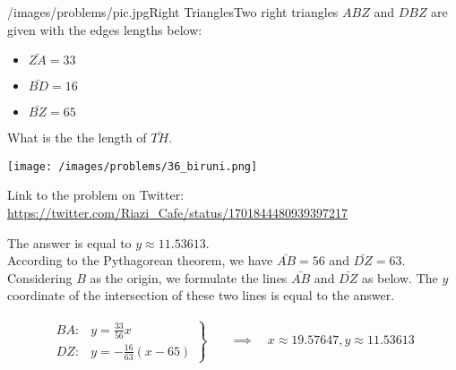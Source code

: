 \begin{problem}{/images/problems/pic.jpg}{Right Triangles}Two right triangles $ABZ$ and $DBZ$ are given with the edges lengths below: 

\begin{itemize}
\item $\bar{ZA}=33$

\item $\bar{BD} =16$

\item $\bar{BZ}=65$
\end{itemize}
What is the the length of $\bar{TH}$.

\begin{center}
\texttt{[image: /images/problems/36\_biruni.png]}
\end{center}

Link to the problem on Twitter:  \url{https://twitter.com/Riazi_Cafe/status/1701844480939397217}\end{problem}
\begin{solution}
The answer is equal to $y \approx 11.53613$.\\[0.2cm]
According to the Pythagorean theorem, we have $\bar{AB}=56$ and $\bar{DZ}=63$. Considering $B$ as the origin, we formulate the lines $\bar{AB}$ and $\bar{DZ}$ as below. The $y$ coordinate of the intersection of these two lines is equal to the answer. %

$$\begin{align}
\left.
\begin{aligned}
BA:& y = \frac{33}{56} x \\
DZ:& y = -\frac{16}{63}(x - 65)
\end{aligned}
\right\}
\quad &\implies \quad
x \approx 19.57647, y \approx 11.53613
\end{align}$$
\end{solution}
